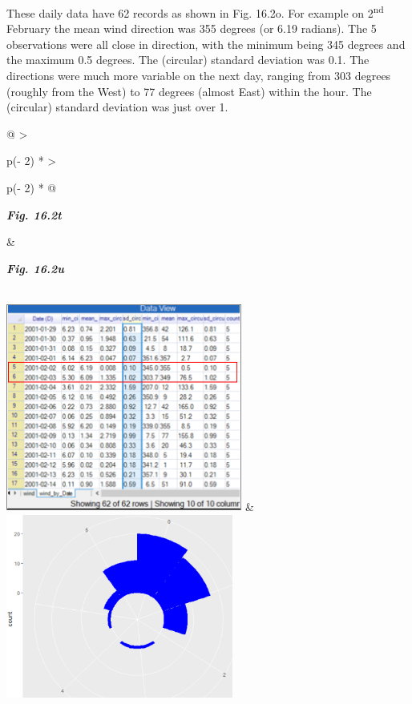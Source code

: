 \documentclass[
  letterpaper,
  DIV=11,
  numbers=noendperiod]{scrreprt}
\begin{document}
These daily data have 62 records as shown in Fig. 16.2o. For example on
2\textsuperscript{nd} February the mean wind direction was 355 degrees
(or 6.19 radians). The 5 observations were all close in direction, with
the minimum being 345 degrees and the maximum 0.5 degrees. The
(circular) standard deviation was 0.1. The directions were much more
variable on the next day, ranging from 303 degrees (roughly from the
West) to 77 degrees (almost East) within the hour. The (circular)
standard deviation was just over 1.

\begin{longtable}[]{@{}
  >{\raggedright\arraybackslash}p{(\columnwidth - 2\tabcolsep) * }
  >{\raggedright\arraybackslash}p{(\columnwidth - 2\tabcolsep) * }@{}}
\toprule\noalign{}
\begin{minipage}[b]{\linewidth}\raggedright
\textbf{\emph{Fig. 16.2t}}
\end{minipage} & \begin{minipage}[b]{\linewidth}\raggedright
\textbf{\emph{Fig. 16.2u}}
\end{minipage} \\
\midrule\noalign{}
\endhead
\bottomrule\noalign{}
\endlastfoot
\includegraphics[width=3.05467in,height=2.70007in]{figures/Fig16.2t.png}
&
\includegraphics[width=2.93636in,height=2.37431in]{figures/Fig16.2u.png} \\
\end{longtable}
\end{document}
